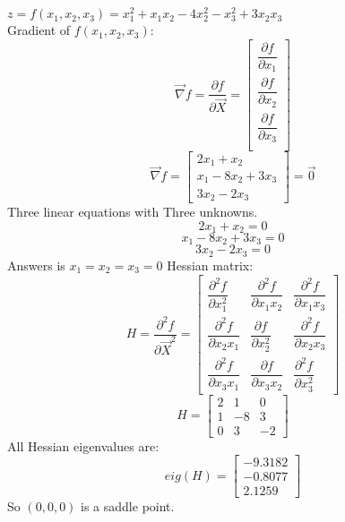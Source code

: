 $z = f(x_1, x_2, x_3) = x_1^2 + x_1x_2 - 4x_2^2-x_3^2 + 3x_2x_3$ \\
Gradient of $f(x_1, x_2, x_3)$:
$$\vec{\nabla} f = \dfrac{\partial f}{\partial \vec{X}}= \begin{bmatrix}
	\dfrac{\partial f}{\partial x_1} \\[8pt]
	\dfrac{\partial f}{\partial x_2} \\[8pt]
	\dfrac{\partial f}{\partial x_3} \\
\end{bmatrix} $$
$$\vec{\nabla} f =   \begin{bmatrix}
	2x_1 + x_2 \\
	x_1 -8x_2 + 3x_3 \\
	3x_2 - 2x_3
\end{bmatrix}  = \vec{0}$$
Three linear equations with Three unknowns.
$$	2x_1 + x_2 = 0 $$
$$x_1 -8x_2 + 3x_3 = 0$$
$$3x_2 - 2x_3 = 0 $$
Answers is $x_1 = x_2 = x_3 = 0$
Hessian matrix:
$$H = \dfrac{\partial^2 f}{\partial \vec{X}^2} = \begin{bmatrix}
	\dfrac{\partial^2 f}{\partial x_1^2} & \dfrac{\partial^2 f}{\partial x_1x_2} & \dfrac{\partial^2 f}{\partial x_1x_3} \\[8pt]
	\dfrac{\partial^2 f}{\partial x_2x_1}  & \dfrac{\partial f}{\partial x_2^2} & \dfrac{\partial^2 f}{\partial x_2x_3}  \\[8pt]
		\dfrac{\partial^2 f}{\partial x_3x_1}  & \dfrac{\partial f}{\partial x_3x_2} & \dfrac{\partial^2 f}{\partial x_3^2} 
\end{bmatrix} $$
$$H = \begin{bmatrix}
	2 & 1 & 0 \\
	1 & -8 & 3 \\
	0 & 3 & -2
\end{bmatrix}$$
All Hessian eigenvalues are:
$$eig(H) = \begin{bmatrix}
	-9.3182  \\
	-0.8077 \\
	2.1259
\end{bmatrix}$$
So $(0, 0, 0)$ is a saddle point.